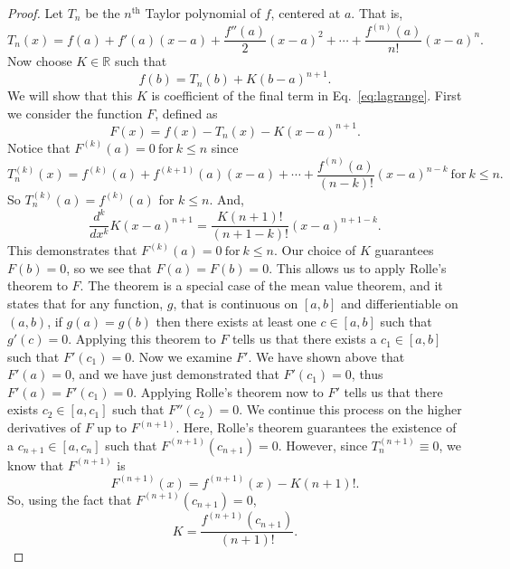 \documentclass[12pt]{article}
\begin{document}
\begin{proof}
Let $T_n$ be the $n^\mathrm{th}$ Taylor polynomial of $f$, centered at $a$. That is,
\begin{equation}
T_n(x) = f(a) + f'(a)(x-a) + \frac{f''(a)}{2}(x-a)^2 + \cdots + \frac{f^{(n)}(a)}{n!}(x-a)^n.
\end{equation}
Now choose $K\in\mathbb{R}$ such that
\begin{equation}
\label{eq:K}
f(b) = T_n(b) + K(b-a)^{n+1}.
\end{equation}
We will show that this $K$ is coefficient of the final term in Eq.~\ref{eq:lagrange}. First we consider the function $F$, defined as
\begin{equation}
F(x) = f(x) - T_n(x) - K(x-a)^{n+1}.
\end{equation}
Notice that $F^{(k)}(a)=0~\mathrm{for}~k\leq n$ since
\begin{equation}
T_n^{(k)}(x) = f^{(k)}(a) + f^{(k+1)}(a)(x-a) + \cdots + \frac{f^{(n)}(a)}{(n-k)!}(x-a)^{n-k}~\mathrm{for}~k\leq n.
\end{equation}
So $T_n^{(k)}(a)=f^{(k)}(a)$ for $k\leq n$. And,
\begin{equation}
\frac{d^k}{dx^k}K(x-a)^{n+1} = \frac{K(n+1)!}{(n+1-k)!}(x-a)^{n+1-k}.
\end{equation}
This demonstrates that $F^{(k)}(a)=0~\mathrm{for}~k\leq n$. Our choice of $K$ guarantees $F(b)=0$, so we see that $F(a)=F(b)=0$. This allows us to apply Rolle's theorem to $F$. The theorem is a special case of the mean value theorem, and it states that for any function, $g$, that is continuous on $[a,b]$ and differientiable on $(a,b)$, if $g(a)=g(b)$ then there exists at least one $c\in[a,b]$ such that $g'(c)=0$. Applying this theorem to $F$ tells us that there exists a $c_1\in[a,b]$ such that $F'(c_1)=0$. Now we examine $F'$. We have shown above that $F'(a)=0$, and we have just demonstrated that $F'(c_1)=0$, thus $F'(a)=F'(c_1)=0$. Applying Rolle's theorem now to $F'$ tells us that there exists $c_2\in[a,c_1]$ such that $F''(c_2)=0$. We continue this process on the higher derivatives of $F$ up to $F^{(n+1)}$. Here, Rolle's theorem guarantees the existence of a $c_{n+1}\in[a,c_n]$ such that $F^{(n+1)}(c_{n+1})=0$. However, since $T_n^{(n+1)}\equiv 0$, we know that $F^{(n+1)}$ is
\begin{equation}
F^{(n+1)}(x) = f^{(n+1)}(x) - K(n+1)!.
\end{equation}
So, using the fact that $F^{(n+1)}(c_{n+1})=0$,
\begin{equation}
K = \frac{f^{(n+1)}(c_{n+1})}{(n+1)!}.

\end{equation}
\end{proof}
\end{document}
